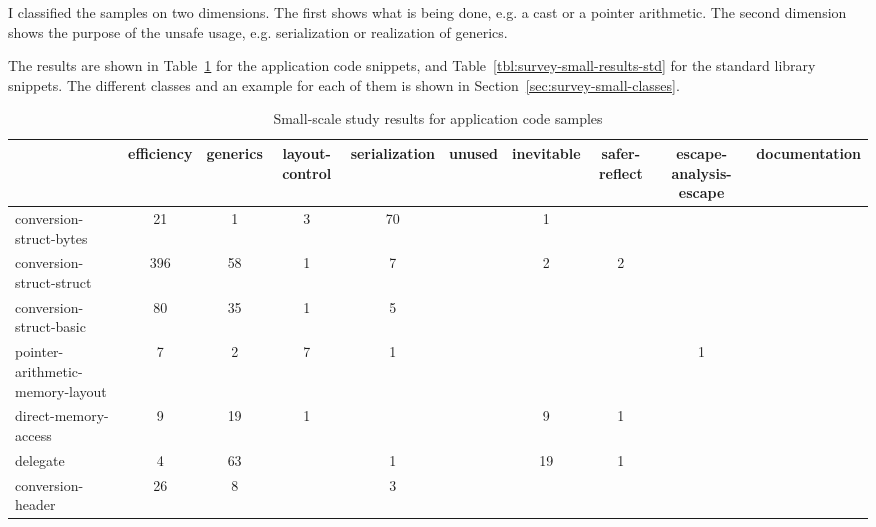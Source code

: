 I classified the samples on two dimensions.
The first shows what is being done, e.g. a cast or a pointer arithmetic.
The second dimension shows the purpose of the unsafe usage, e.g. serialization or realization of generics.

The results are shown in Table~\ref{tbl:survey-small-results-app} for the application code snippets, and
Table~\ref{tbl:survey-small-results-std} for the standard library snippets.
The different classes and an example for each of them is shown in Section~\ref{sec:survey-small-classes}.

\begin{table}[h]
    \centering
    \caption{Small-scale study results for application code samples}
    \label{tbl:survey-small-results-app}
    \begin{tabularx}{\textwidth}{Xccccccccc}
        \toprule
        {} & efficiency & generics & layout-control & serialization & unused & inevitable & safer-reflect & escape-analysis-escape & documentation \\
        \midrule
        conversion-struct-bytes &         21 &        1 &              3 &            70 &        &          1 &               &                        &               \\
        \rowcolor{verylightgray}
        conversion-struct-struct &        396 &       58 &              1 &             7 &        &          2 &             2 &                        &               \\
        conversion-struct-basic &         80 &       35 &              1 &             5 &        &            &               &                        &               \\
        \rowcolor{verylightgray}
        pointer-arithmetic-memory-layout &          7 &        2 &              7 &             1 &        &            &               &                      1 &               \\
        direct-memory-access &          9 &       19 &              1 &               &        &          9 &             1 &                        &               \\
        \rowcolor{verylightgray}
        delegate &          4 &       63 &                &             1 &        &         19 &             1 &                        &               \\
        conversion-header &         26 &        8 &                &             3 &        &            &               &                        &               \\

\end{tabularx}
\end{table}
